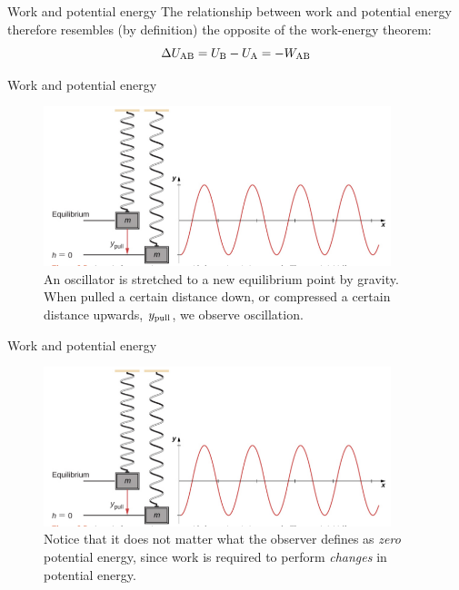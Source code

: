 \documentclass{beamer}
\begin{document}
\begin{frame}{Work and potential energy}
The relationship between work and potential energy therefore resembles (by definition) the opposite of the work-energy theorem:
\begin{equation}
\Delta U_{\rm AB} = U_{\rm B} - U_{\rm A} = -W_{\rm AB}
\end{equation}
\end{frame}

\begin{frame}{Work and potential energy}
\begin{figure}
\centering
\includegraphics[width=0.9\textwidth,trim=0cm 0.1cm 0cm 0cm,clip=true]{figures/osc.png}
\caption{\label{fig:osc} An oscillator is stretched to a new equilibrium point by gravity.  When pulled a certain distance down, or compressed a certain distance upwards, $y_{\rm pull}$, we observe oscillation.}
\end{figure}
\end{frame}

\begin{frame}{Work and potential energy}
\begin{figure}
\centering
\includegraphics[width=0.9\textwidth,trim=0cm 0.1cm 0cm 0cm,clip=true]{figures/osc.png}
\caption{\label{fig:osc2} Notice that it does not matter what the observer defines as \textit{zero} potential energy, since work is required to perform \textit{changes} in potential energy.}
\end{figure}
\end{frame}
\end{document}
